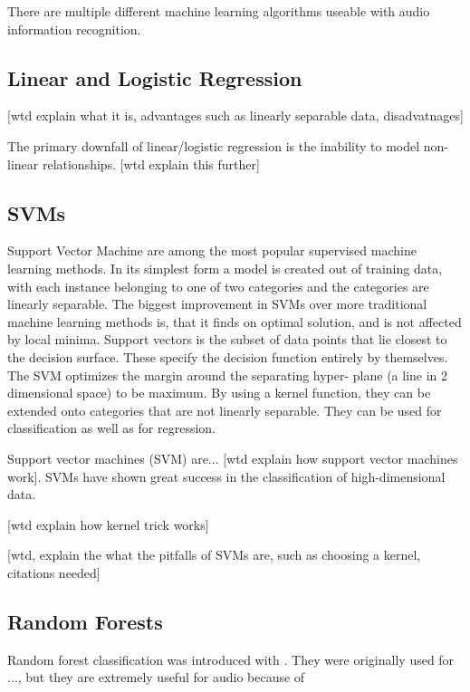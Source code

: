 There are multiple different machine learning algorithms useable with audio information recognition.


\subsection{Linear and Logistic Regression}

[wtd explain what it is, advantages such as linearly separable data, disadvatnages]

The primary downfall of linear/logistic regression is the inability to model non-linear relationships. [wtd explain this further]

\subsection{SVMs}


Support Vector Machine are among the most popular supervised machine learning methods. In its simplest form a model is created out of training data, with each instance belonging to one of two categories and the categories are linearly separable. The biggest improvement in SVMs over more traditional machine learning methods is, that it finds on optimal solution, and is not affected by local minima. Support vectors is the subset of data points that lie closest to the decision surface. These specify the decision function entirely by themselves. The SVM optimizes the margin around the separating hyper- plane (a line in 2 dimensional space) to be maximum. By using a kernel function, they can be extended onto categories that are not linearly separable. They can be used for classification as well as for regression.


Support vector machines (SVM) are... [wtd explain how support vector machines work].  SVMs have shown great success in the classification of high-dimensional data.

[wtd explain how kernel trick works]

[wtd, explain the what the pitfalls of SVMs are, such as choosing a kernel, citations needed]

\subsection{Random Forests}



Random forest classification was introduced with \cite{Breiman2001} . They were originally used for ...,  but they are extremely useful for audio because of



